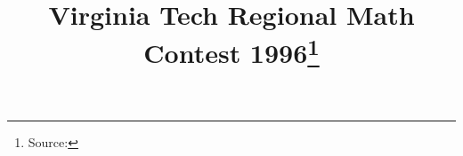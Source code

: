 \documentclass[10pt]{article}
\begin{document}
\title{Virginia Tech Regional Math Contest 1996\footnote{Source: \source}}
\author{\vspace{-2ex}}
\date{\vspace{-6ex}} %
\maketitle







\end{document}
